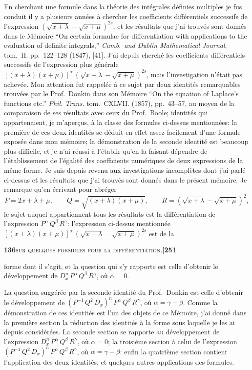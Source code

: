 \documentclass[11pt]{article}
\begin{document}
\medskip

En cherchant une formule dans la théorie des intégrales définies multiples je fus conduit il y a plusieurs années à chercher les coefficients différentiels successifs de l'expression $(\sqrt{x+\lambda} - \sqrt{x+\mu})^{2s}$, et les résultats que j'ai trouvés sont donnés dans le Mémoire ``On certain formulae for differentiation with applications to the evaluation of definite integrals,'' \textit{Camb.~and Dublin Mathematical Journal}, tom.~II. pp.~122--128 (1847), [41]. J'ai depuis cherché les coefficients différentiels successifs de l'expression plus générale $[(x+\lambda)(x+\mu)]^{\alpha}\,(\sqrt{x+\lambda} - \sqrt{x+\mu})^{2s}$, mais l'investigation n'était pas achevée. Mon attention fut rappelée à ce sujet par deux identités remarquables trouvées par le Prof.~Donkin dans son Mémoire ``On the equation of Laplace's functions etc.'' \textit{Phil. Trans.} tom.~CXLVII. (1857), pp.~43--57, au moyen de la comparaison de ses résultats avec ceux du Prof.~Boole; identités qui appartenaient, je m'aperçus, à la classe des formules ci-dessus mentionnées: la première de ces deux identités se déduit en effet assez facilement d'une formule exposée dans mon mémoire; la démonstration de la seconde identité est beaucoup plus difficile, et je n'ai réussi à l'établir qu'en la faisant dépendre de l'établissement de l'égalité des coefficients numériques de deux expressions de la même forme. Je suis depuis revenu aux investigations incomplètes dont j'ai parlé ci-dessus et les résultats que j'ai trouvés sont donnés dans le présent mémoire. Je remarque qu'en écrivant pour abréger
\[
P = 2x + \lambda + \mu,\qquad Q = \sqrt{(x+\lambda)(x+\mu)},\qquad R = (\sqrt{x+\lambda} - \sqrt{x+\mu})^2,
\]
le sujet auquel appartiennent tous les résultats est la différentiation de l'expression $P^{\alpha}\,Q^{\beta}\,R^{\gamma}$: l'expression ci-dessus mentionnée $[(x+\lambda)(x+\mu)]^{\alpha}\,(\sqrt{x+\lambda} - \sqrt{x+\mu})^{2s}$ est de la

\newpage

\noindent\textbf{136}\hfill\textsc{sur quelques formules pour la différentiation.}\hfill\textbf{[251}

\medskip

\noindent forme dont il s'agit, et la question qui s'y rapporte est celle d'obtenir le développement de $D_x^n\,P^{\alpha}\,Q^{\beta}\,R^{\gamma}$, où $\alpha = 0$.

La question suggérée par la seconde identité du Prof.~Donkin est celle d'obtenir le développement de $(P^{-1}\,Q^2\,D_x)^n\,P^{\alpha}\,Q^{\beta}\,R^{\gamma}$, où $\alpha = \gamma - \beta$. Comme la démonstration de ces identités est l'un des objets de ce Mémoire, j'ai donné dans la première section la réduction des identités à la forme sous laquelle je les ai depuis considérées. La seconde section se rapporte au développement de l'expression $D_x^n\,P^{\alpha}\,Q^{\beta}\,R^{\gamma}$, où $\alpha = 0$; la troisième section à celui de l'expression $(P^{-1}\,Q^2\,D_x)^n\,P^{\alpha}\,Q^{\beta}\,R^{\gamma}$, où $\alpha = \gamma - \beta$: enfin la quatrième section contient l'application des deux identités, et quelques autres applications des formules.
\end{document}
